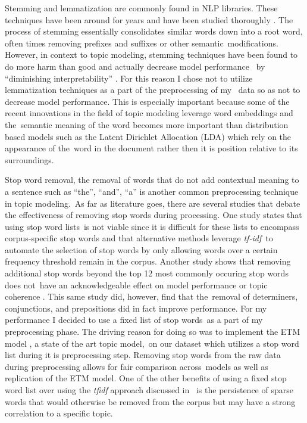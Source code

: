\documentclass[letterpaper,12pt]{article}
\begin{document}
Stemming and lemmatization are commonly found in NLP libraries. These techniques have been around for years and have been studied thoroughly \cite{lovins1968development, kanis2010comparison, jivani2011comparative, larkey2002improving}.
The process of stemming essentially consolidates similar words down into a root word, often times removing prefixes and suffixes or other semantic\
modifications. However, in context to topic modeling, stemming techniques have been found to do more harm than good and actually decrease model performance \cite{schofieldunderstanding} \
by ``diminishing interpretability'' \cite{boyd2014care}. For this reason I chose not to utilize lemmatization techniques as a part of the preprocessing of my \
data so as not to decrease model performance. This is especially important because some of the recent innovations in the field of topic modeling leverage word embeddings \cite{mikolov2013distributed} and the\
semantic meaning of the word becomes more important than distribution based models such as the Latent Dirichlet Allocation (LDA) \cite{blei2003latent} which rely on the appearance of the\
word in the document rather then it is position relative to its surroundings.

Stop word removal, the removal of words that do not add contextual meaning to a sentence such as ``the'', ``and'', ``a'' is another common preprocessing technique in topic modeling.\
As far as literature goes, there are several studies that debate the effectiveness of removing stop words during processing. One study states that using stop word lists\
is not viable since it is difficult for these lists to encompass corpus-specific stop words \cite{boyd2014care} and that alternative methods leverage \emph{tf-idf}\cite{Salton1968AutomaticIO}\
to automate the selection of stop words by only allowing words over a certain frequency threshold remain in the corpus. Another study shows that removing additional stop words beyond the top 12 most commonly occuring stop words does not\
have an acknowledgeable effect on model performance or topic coherence \cite{schofieldunderstanding}. This same study did, however, find that the\
removal of determiners, conjunctions, and prepositions did in fact improve performance. For my performance I decided to use a fixed list of stop words\
as a part of my preprocessing phase. The driving reason for doing so was to implement the ETM model \cite{dieng2019topic}, a state of the art topic model,\
on our dataset which utilizes a stop word list during it is preprocessing step. Removing stop words from the raw data during preprocessing allows for fair comparison across\
models as well as replication of the ETM model. One of the other benefits of using a fixed stop word list over using the \emph{tfidf} approach discussed in \cite{boyd2014care}\
is the persistence of sparse words that would otherwise be removed from the corpus but may have a strong correlation to a specific topic.
\end{document}
